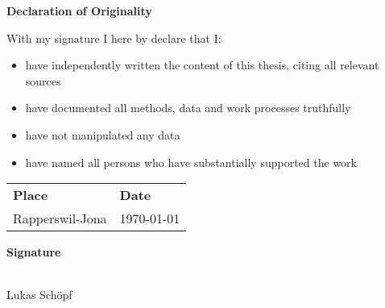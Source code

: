 %
%
%
\pagestyle{plain}
\vspace{0.8cm}
\noindent
\textbf{\Huge Declaration of Originality}
\vspace{1cm}

\noindent
With my signature I here by declare that I:
\begin{itemize}
    \item have independently written the content of this thesis, citing all relevant sources
    \item have documented all methods, data and work processes truthfully
    \item have not manipulated any data
    \item have named all persons who have substantially supported the work
\end{itemize}



\noindent
\begin{tabular}{@{}l@{} l}    
    \textbf{Place} & \textbf{Date} \\
    Rapperswil-Jona \hspace{0.5cm}  & \today
\end{tabular}
\vspace{2.5cm}

\noindent
\textbf{Signature} 
\vspace{0.5cm}

\noindent
\makebox[5cm]{\hrulefill} \hspace{2cm}\\
\vspace{1.0cm}
Lukas Schöpf

\clearpage